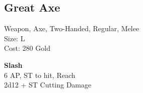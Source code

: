 \subsection{Great Axe}\label{weapon:greatAxe}
Weapon, Axe, Two-Handed, Regular, Melee\\
Size: L\\
Cost: 280 Gold

\textbf{Slash}\\
6 AP, ST to hit,  Reach\\
2d12 + ST Cutting Damage
